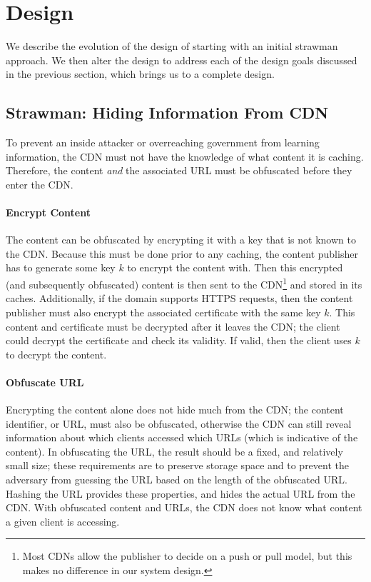 \section{Design}
\label{sec:design}
We describe the evolution of the design of \system{} starting with an initial strawman approach.  We then 
alter the design to address each of the design goals discussed in the previous section, which brings us 
to a complete design.

\subsection{Strawman: Hiding Information From CDN}
\label{sec:obfuscate_content}
To prevent an inside attacker or overreaching government from learning information, the CDN 
must not have the knowledge of what content it is caching.  Therefore, the content {\it and} the 
associated URL must be obfuscated before they enter the CDN.  

\paragraph{Encrypt Content}  The content can be obfuscated by encrypting it with a key that is not 
known to the CDN.  Because this must be done prior to any caching, the content publisher 
has to generate some key $k$ to encrypt the content with.  Then this encrypted (and subsequently 
obfuscated) content is then sent to the CDN\footnote{Most CDNs
allow the publisher to decide on a push or pull model, but this makes no difference in our 
system design.} and stored in its caches.  
Additionally, if the domain supports HTTPS requests, then the content publisher must also encrypt the 
associated certificate with the same key $k$.  This content and certificate must be decrypted after 
it leaves the CDN; the client could decrypt the certificate and check its validity.  If valid, then 
the client uses $k$ to decrypt the content.  

\paragraph{Obfuscate URL} Encrypting the content alone does not hide much from the CDN; the content 
identifier, or URL, must also be obfuscated, otherwise the CDN can still reveal information about 
which clients accessed which URLs (which is indicative of the content).  In obfuscating the 
URL, the result should be a fixed, and relatively small size; these requirements are to preserve 
storage space and to prevent the adversary from guessing the URL based on the length of the obfuscated 
URL.  Hashing the URL provides these 
properties, and hides the actual URL from the CDN. With obfuscated content and 
URLs, the CDN does not know what content a given client is accessing.

